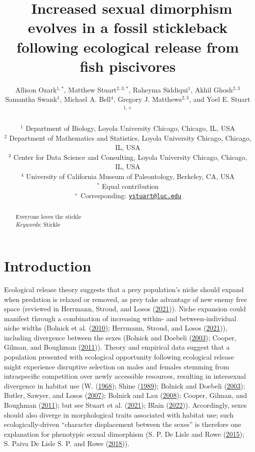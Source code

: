 \documentclass[
  12pt,
]{article}
\title{~\Large Increased sexual dimorphism evolves in a fossil
stickleback following ecological release from fish piscivores}
\author{\large Allison Ozark\(^{1,*}\), Matthew Stuart\(^{2,3,*}\),
Raheyma Siddiqui\(^1\), Akhil Ghosh\(^{2,3}\)\\
\large Samantha Swank\(^1\), Michael A. Bell\(^4\), Gregory J.
Matthews\(^{2,3}\), and Yoel E. Stuart\(^{1,+}\)\\
\vspace{-1.1mm}\\
\large \(^1\) Department of Biology, Loyola University Chicago, Chicago,
IL, USA \vspace{-1.1mm}\\
\large \(^2\) Department of Mathematics and Statistics, Loyola
University Chicago, Chicago, IL, USA \vspace{-1.1mm}\\
\large \(^3\) Center for Data Science and Consulting, Loyola University
Chicago, Chicago, IL, USA \vspace{-1.1mm}\\
\large \(^4\) University of California Museum of Paleontology, Berkeley,
CA, USA \vspace{-1.1mm}\\
\large \(^*\) Equal contribution \vspace{-1.1mm}\\
\large \(^+\) Corresponding:
\href{mailto:ystuart@luc.edu}{\nolinkurl{ystuart@luc.edu}}
\vspace{-1.1mm}}
\date{}
\begin{document}
\maketitle
\begin{abstract}
Everyone loves the stickle \vspace{2mm}\\
\emph{Keywords}: Stickle
\end{abstract}

\newcommand{\iid}{\overset{iid}{\sim}}

\newpage

\hypertarget{sec:intro}{%
\section{Introduction}\label{sec:intro}}

Ecological release theory suggests that a prey population's niche should
expand when predation is relaxed or removed, as prey take advantage of
new enemy free space (reviewed in Herrmann, Stroud, and Losos
(\protect\hyperlink{ref-Herrmann2021}{2021})). Niche expansion could
manifest through a combination of increasing within- and
between-individual niche widths (Bolnick et al.
(\protect\hyperlink{ref-Bolnick2010}{2010}); Herrmann, Stroud, and Losos
(\protect\hyperlink{ref-Herrmann2021}{2021})), including divergence
between the sexes (Bolnick and Doebeli
(\protect\hyperlink{ref-Bolnick2003}{2003}); Cooper, Gilman, and
Boughman (\protect\hyperlink{ref-Cooper2011}{2011})). Theory and
empirical data suggest that a population presented with ecological
opportunity following ecological release might experience disruptive
selection on males and females stemming from intraspecific competition
over newly accessible resources, resulting in intersexual divergence in
habitat use (W. (\protect\hyperlink{ref-Schoener1968}{1968}); Shine
(\protect\hyperlink{ref-Shine1989}{1989}); Bolnick and Doebeli
(\protect\hyperlink{ref-Bolnick2003}{2003}); Butler, Sawyer, and Losos
(\protect\hyperlink{ref-Butler2007}{2007}); Bolnick and Lau
(\protect\hyperlink{ref-Bolnick2008}{2008}); Cooper, Gilman, and
Boughman (\protect\hyperlink{ref-Cooper2011}{2011}); but see Stuart et
al. (\protect\hyperlink{ref-Stuart2021}{2021}); Blain
(\protect\hyperlink{ref-Blain2022}{2022})). Accordingly, sexes should
also diverge in morphological traits associated with habitat use; such
ecologically-driven ``character displacement between the sexes'' is
therefore one explanation for phenotypic sexual dimorphism (S. P. De
Lisle and Rowe (\protect\hyperlink{ref-deLisleRowe2015}{2015}); S. Paiva
De Lisle S. P. and Rowe (\protect\hyperlink{ref-deLisleNco2018}{2018})).
\end{document}
